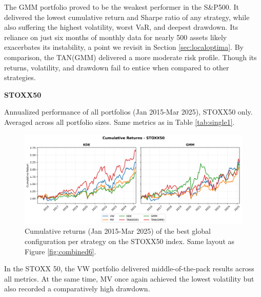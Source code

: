The GMM portfolio proved to be the weakest performer in the S\&P500. It delivered the lowest cumulative return and Sharpe ratio of any strategy, while also suffering the highest volatility, worst VaR, and deepest drawdown. Its reliance on just six months of monthly data for nearly 500 assets likely exacerbates its instability, a point we revisit in Section \ref{sec:localoptima}. By comparison, the TAN(GMM) delivered a more moderate risk profile. Though its returns, volatility, and drawdown fail to entice when compared to other strategies.

\begin{center}
  \textbf{STOXX50}
\end{center}
\begin{table}[H]
  \centering
  
  \caption[Global best configuration - All strategies - STOXX50]{Annualized performance of all portfolios (Jan 2015-Mar 2025), STOXX50 only. Averaged across all portfolio sizes. Same metrics as in Table \ref{tab:single1}.}
  \label{tab:single8}
\end{table}

\begin{figure}[H]
  \begin{center}
  \begin{minipage}{1\textwidth}
    \centering
    \includegraphics[width=\textwidth]{images/40_9.png}
  \end{minipage}
  \caption[Global best configuration - STOXX50 - Cumulative returns]{Cumulative returns (Jan 2015-Mar 2025) of the best global configuration per strategy on the STOXX50 index. Same layout as Figure \ref{fig:combined6}.}
  \label{fig:combined9}
  \end{center}
  \end{figure}

In the STOXX 50, the VW portfolio delivered middle-of-the-pack results across all metrics. At the same time, MV once again achieved the lowest volatility but also recorded a comparatively high drawdown. 

